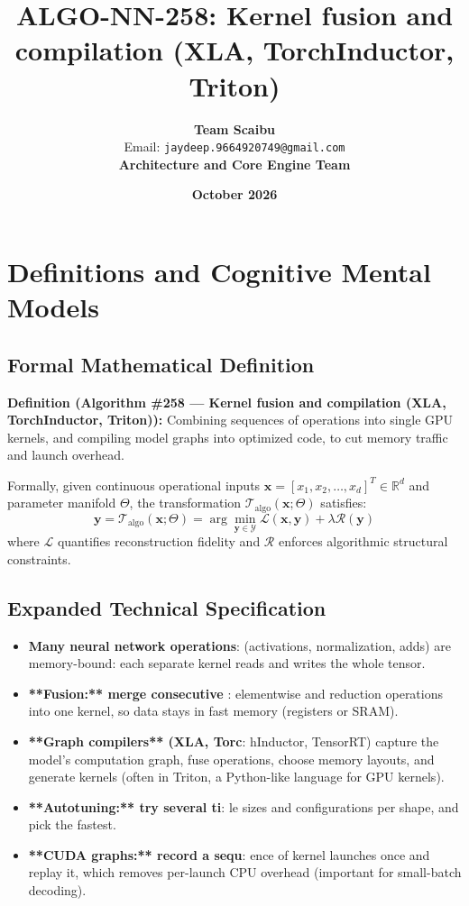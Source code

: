 \documentclass[11pt,a4paper]{article}
\title{\textbf{ALGO-NN-258: Kernel fusion and compilation (XLA, TorchInductor, Triton)}}
\author{\textbf{Team Scaibu} \\ \small Email: \texttt{jaydeep.9664920749@gmail.com} \\ \small \textbf{Architecture and Core Engine Team}}
\date{\textbf{October 2026}}
\theoremstyle{definition}
\begin{document}
\maketitle

\section{Definitions and Cognitive Mental Models}

\subsection{Formal Mathematical Definition}
\textbf{Definition (Algorithm \#258 --- Kernel fusion and compilation (XLA, TorchInductor, Triton)):}
Combining sequences of operations into single GPU kernels, and compiling model graphs into optimized code, to cut memory traffic and launch overhead.

Formally, given continuous operational inputs $\mathbf{x} = [x_1, x_2, \dots, x_d]^T \in \mathbb{R}^d$ and parameter manifold $\Theta$, the transformation $\mathcal{T}_{\text{algo}}(\mathbf{x}; \Theta)$ satisfies:
{\boldmath
\begin{equation}
\mathbf{y} = \mathcal{T}_{\text{algo}}(\mathbf{x}; \Theta) = \arg\min_{\mathbf{y} \in \mathcal{Y}} \mathcal{L}(\mathbf{x}, \mathbf{y}) + \lambda \mathcal{R}(\mathbf{y})
\end{equation}
}
where $\mathcal{L}$ quantifies reconstruction fidelity and $\mathcal{R}$ enforces algorithmic structural constraints.

\subsection{Expanded Technical Specification}
\begin{itemize}
\item \textbf{Many neural network operations}:  (activations, normalization, adds) are memory-bound: each separate kernel reads and writes the whole tensor.
\item \textbf{**Fusion:** merge consecutive }: elementwise and reduction operations into one kernel, so data stays in fast memory (registers or SRAM).
\item \textbf{**Graph compilers** (XLA, Torc}: hInductor, TensorRT) capture the model's computation graph, fuse operations, choose memory layouts, and generate kernels (often in Triton, a Python-like language for GPU kernels).
\item \textbf{**Autotuning:** try several ti}: le sizes and configurations per shape, and pick the fastest.
\item \textbf{**CUDA graphs:** record a sequ}: ence of kernel launches once and replay it, which removes per-launch CPU overhead (important for small-batch decoding).
\end{itemize}
\end{document}

